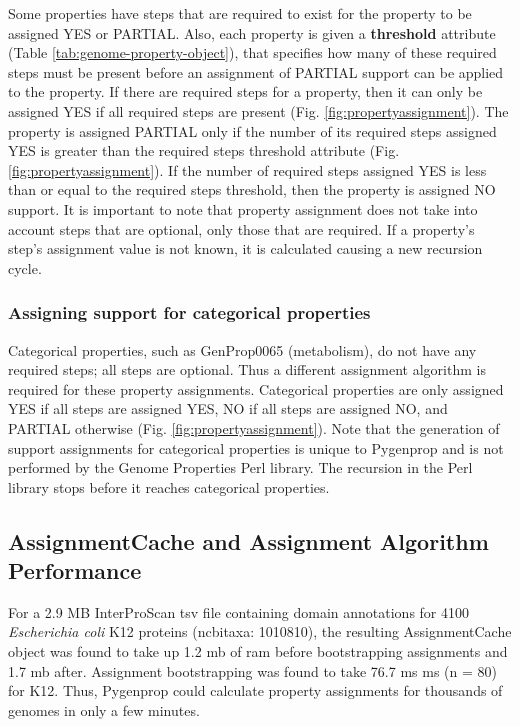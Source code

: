 Some properties have steps that are required to exist for the property to be assigned YES or PARTIAL. Also, each property is given a \textbf{threshold} attribute (Table \ref{tab:genome-property-object}), that specifies how many of these required steps must be present before an assignment of PARTIAL support can be applied to the property. If there are required steps for a property, then it can only be assigned YES if all required steps are present (Fig. \ref{fig:propertyassignment}). The property is assigned PARTIAL only if the number of its required steps assigned YES is greater than the required steps threshold attribute (Fig. \ref{fig:propertyassignment}). If the number of required steps assigned YES is less than or equal to the required steps threshold, then the property is assigned NO support. It is important to note that property assignment does not take into account steps that are optional, only those that are required. If a property's step's assignment value is not known, it is calculated causing a new recursion cycle.

\subsubsection{Assigning support for categorical properties}

Categorical properties, such as GenProp0065 (metabolism), do not have any required steps; all steps are optional. Thus a different assignment algorithm is required for these property assignments. Categorical properties are only assigned YES if all steps are assigned YES, NO if all steps are assigned NO, and PARTIAL otherwise (Fig. \ref{fig:propertyassignment}). Note that the generation of support assignments for categorical properties is unique to Pygenprop and is not performed by the Genome Properties Perl library. The recursion in the Perl library stops before it reaches categorical properties.

\subsection{AssignmentCache and Assignment Algorithm Performance} \label{AssignmentCache-Performance}

For a 2.9 MB InterProScan \gls{tsv} file containing domain annotations for 4100 \textit{Escherichia coli} K12 proteins (\gls{ncbitaxa}: 1010810), the resulting AssignmentCache object was found to take up 1.2 \gls{mb} of \gls{ram} before bootstrapping assignments and 1.7 \gls{mb} after. Assignment bootstrapping was found to take 76.7 ms  ms (\gls{n} = 80) for K12. Thus, Pygenprop could calculate property assignments for thousands of genomes in only a few minutes.

